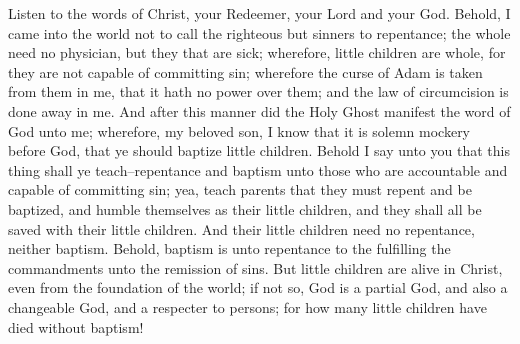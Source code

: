 \bverse \iffalse Listen to the words of Christ, your Redeemer, your Lord and your God. Behold, I came into the world not to call the righteous but sinners to repentance; the whole need no physician, but they that are sick; wherefore, little children are whole, for they are not capable of committing sin; wherefore the curse of Adam is taken from them in me, that it hath no power over them; and the law of circumcision is done away in me. \fi
Listen to the words of Christ, your Redeemer, your Lord and your God. Behold, I came into the world not to call the righteous but sinners to repentance; the whole need no physician, but they that are sick; wherefore, little children are whole, for they are not capable of committing sin; wherefore the curse of Adam is taken from them in me, that it hath no power over them; and the law of circumcision is done away in me.
\bverse \iffalse And after this manner did the Holy Ghost manifest the word of God unto me; wherefore, my beloved son, I know that it is solemn mockery before God, that ye should baptize little children. \fi
And after this manner did the Holy Ghost manifest the word of God unto me; wherefore, my beloved son, I know that it is solemn mockery before God, that ye should baptize little children.
\bverse \iffalse Behold I say unto you that this thing shall ye teach--repentance and baptism unto those who are accountable and capable of committing sin; yea, teach parents that they must repent and be baptized, and humble themselves as their little children, and they shall all be saved with their little children. \fi
Behold I say unto you that this thing shall ye teach--repentance and baptism unto those who are accountable and capable of committing sin; yea, teach parents that they must repent and be baptized, and humble themselves as their little children, and they shall all be saved with their little children.
\bverse \iffalse And their little children need no repentance, neither baptism. Behold, baptism is unto repentance to the fulfilling the commandments unto the remission of sins. \fi
And their little children need no repentance, neither baptism. Behold, baptism is unto repentance to the fulfilling the commandments unto the remission of sins.
\bverse \iffalse But little children are alive in Christ, even from the foundation of the world; if not so, God is a partial God, and also a changeable God, and a respecter to persons; for how many little children have died without baptism! \fi
But little children are alive in Christ, even from the foundation of the world; if not so, God is a partial God, and also a changeable God, and a respecter to persons; for how many little children have died without baptism!

